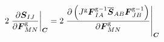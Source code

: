 \documentclass[10pt,letterpaper,oneside]{report}
\newcommand{\ten}[1]{\mbox{\boldmath $#1$}{}}
\newcommand{\tenf}[1]{\mbox{{\sffamily{\bfseries {#1}}}}}
\newcommand{\scas}[1]{\mbox{{\scriptsize{${\rm{#1}}$}}}{}}
\newcommand{\tens}[1]{\mbox{\boldmath{\scriptsize{$#1$}}}{}}
\begin{document}
\begin{align}
2 \left. \frac{\partial \ten{S}_{IJ}}{\partial \ten{F}^{\scas{g}}_{MN}} \right|_{\tens{C}} 
={}& 2 \left. \frac{\partial \left( J^{\scas{g}} \ten{F}^{\scas{g}-1}_{IA} \overline{\ten{S}}_{AB} \ten{F}^{\scas{g}-1}_{JB} \right) }{\partial \ten{F}^{\scas{g}}_{MN}} \right|_{\tens{C}} 
\\

\end{align}
\end{document}
